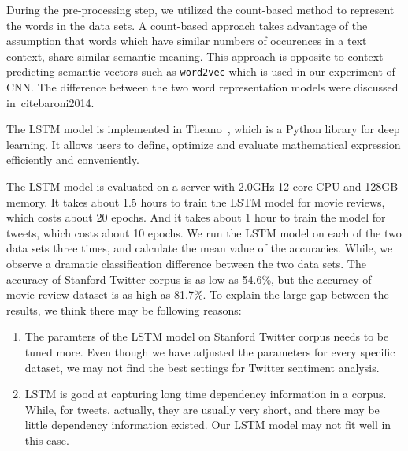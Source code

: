 During the pre-processing step, we utilized the count-based method to represent the words in the data sets. A count-based approach takes advantage of the assumption that words which have similar numbers of occurences in a text context, share similar semantic meaning. This approach is opposite to context-predicting semantic vectors such as {\tt word2vec} which is used in our experiment of CNN. The difference between the two word representation models were discussed in~cite{baroni2014}. 

The LSTM model is implemented in Theano~\cite{bastien2012, bergstra2010}, which is a Python library for deep learning. It allows users to define, optimize and evaluate mathematical expression efficiently and conveniently. 

The LSTM model is evaluated on a server with 2.0GHz 12-core CPU and 128GB memory. It takes about 1.5 hours to train the LSTM model for movie reviews, which costs about 20 epochs. And it takes about 1 hour to train the model for tweets, which costs about 10 epochs. We run the LSTM model on each of the two data sets three times, and calculate the mean value of the accuracies. While, we observe a dramatic classification difference between the two data sets. The accuracy of Stanford Twitter corpus is as low as 54.6\%, but the accuracy of movie review dataset is as high as 81.7\%. To explain the large gap between the results, we think there may be following reasons:

\begin{enumerate}
\item The paramters of the LSTM model on Stanford Twitter corpus needs to be tuned more. Even though we have adjusted the parameters for every specific dataset, we may not find the best settings for Twitter sentiment analysis.
\item LSTM is good at capturing long time dependency information in a corpus. While, for tweets, actually, they are usually very short, and there may be little dependency information existed. Our LSTM model may not fit well in this case.
\end{enumerate}
